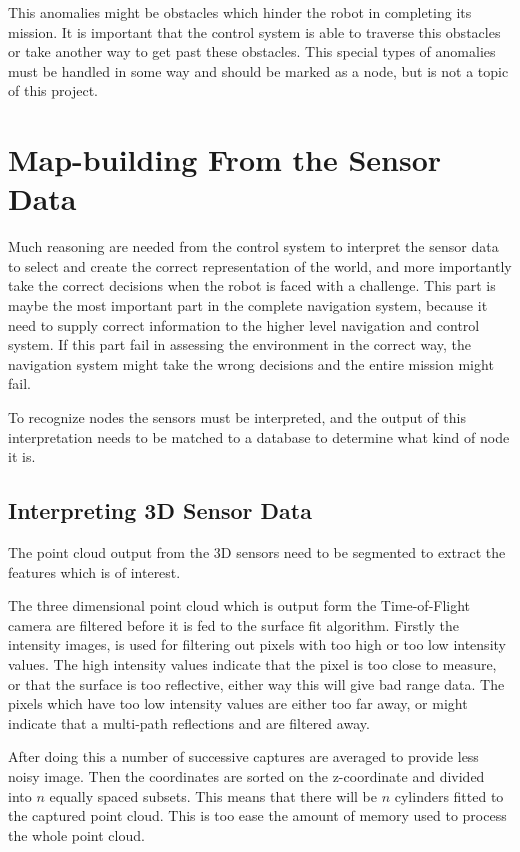 This anomalies might be obstacles which hinder the robot in completing its mission. It is
important that the control system is able to traverse this obstacles or take another way
to get past these obstacles. This special types of anomalies must be handled in some way
and should be marked as a node, but is not a topic of this project. 

\section{Map-building From the Sensor Data}
Much reasoning are needed from the control system to interpret the sensor data to select
and create the correct representation of the world, and more importantly take the correct
decisions when the robot is faced with a challenge. This part is maybe the most important
part in the complete navigation system, because it need to supply correct information to
the higher level navigation and control system. If this part fail in assessing the
environment in the correct way, the navigation system might take the wrong decisions and
the entire mission might fail. 

To recognize nodes the sensors must be interpreted, and the output of this interpretation
needs to be matched to a database to determine what kind of node it is. 

\subsection{Interpreting 3D Sensor Data}
The point cloud output from the 3D sensors need to be segmented to extract the features
which is of interest. 

The three dimensional point cloud which is output form the Time-of-Flight camera are
filtered before it is fed to the surface fit algorithm. Firstly the intensity images, is
used for filtering out pixels with too high or too low intensity values. The high
intensity values indicate that the pixel is too close to measure, or that the surface is
too reflective, either way this will give bad range data. The pixels which have too low
intensity values are either too far away, or might indicate that a multi-path reflections
and are filtered away. 

After doing this a number of successive captures are averaged to provide less noisy image.
Then the coordinates are sorted on the z-coordinate and divided into $n$ equally spaced
subsets. This means that there will be $n$ cylinders fitted to the captured point cloud.
This is too ease the amount of memory used to process the whole point cloud. 


